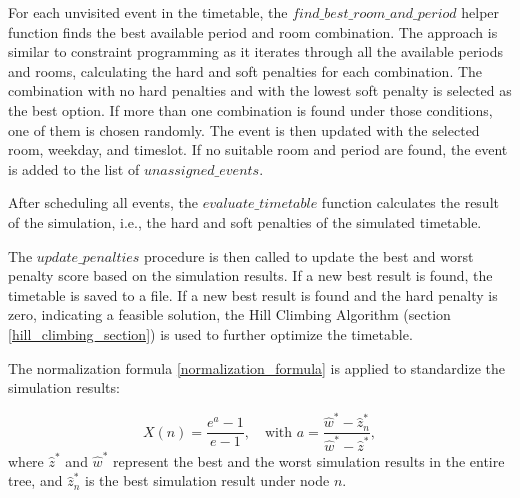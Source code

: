 For each unvisited event in the timetable, the \(find\_best\_room\_and\_period\) helper function finds the best available period and room combination. The approach is similar to constraint programming as it iterates through all the available periods and rooms, calculating the hard and soft penalties for each combination. The combination with no hard penalties and with the lowest soft penalty is selected as the best option. If more than one combination is found under those conditions, one of them is chosen randomly. The event is then updated with the selected room, weekday, and timeslot. If no suitable room and period are found, the event is added to the list of \(unassigned\_events\).

After scheduling all events, the \(evaluate\_timetable\) function calculates the result of the simulation, i.e., the hard and soft penalties of the simulated timetable.

The \(update\_penalties\) procedure is then called to update the best and worst penalty score based on the simulation results. If a new best result is found, the timetable is saved to a file. If a new best result is found and the hard penalty is zero, indicating a feasible solution, the Hill Climbing Algorithm (section \ref{hill_climbing_section}) is used to further optimize the timetable.

The normalization formula \ref{normalization_formula} \cite{pedroso_tree_2015} is applied to standardize the simulation results:

\begin{equation}
X(n) = \frac{e^a - 1}{e - 1}, \quad \text{with } a = \frac{\hat{w}^* - \hat{z}_n^*}{\hat{w}^* - \hat{z}^*},\label{normalization_formula}
\end{equation}
where \(\hat{z}^*\) and \(\hat{w}^*\) represent the best and the worst simulation results in the entire tree, and \(\hat{z}_n^*\) is the best simulation result under node \(n\).

